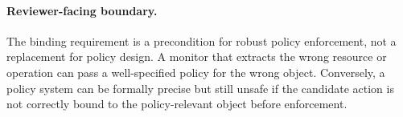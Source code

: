 \paragraph{Reviewer-facing boundary.}
The binding requirement is a precondition for robust policy enforcement, not a replacement for policy design. A monitor that extracts the wrong resource or operation can pass a well-specified policy for the wrong object. Conversely, a policy system can be formally precise but still unsafe if the candidate action is not correctly bound to the policy-relevant object before enforcement.
